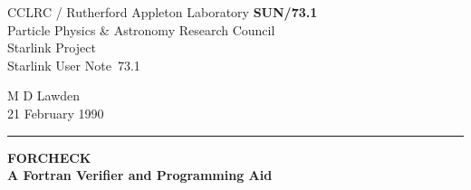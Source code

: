 \documentclass[11pt,twoside]{article}
\newcommand{\stardoccategory}  {Starlink User Note}
\newcommand{\stardocinitials}  {SUN}
\newcommand{\stardocnumber}    {73.1}
\newcommand{\stardocauthors}   {M D Lawden}
\newcommand{\stardocdate}      {21 February 1990}
\newcommand{\stardoctitle}     {FORCHECK\\[2ex]
                               A Fortran Verifier and Programming Aid}
\newcommand{\stardocname}{\stardocinitials /\stardocnumber}
\newenvironment{latexonly}{}{}
\begin{document}
\thispagestyle{empty}

\begin{latexonly}
   CCLRC / {\sc Rutherford Appleton Laboratory} \hfill {\bf \stardocname}\\
   {\large Particle Physics \& Astronomy Research Council}\\
   {\large Starlink Project\\}
   {\large \stardoccategory\ \stardocnumber}
   \begin{flushright}
   \stardocauthors\\
   \stardocdate
   \end{flushright}
   \vspace{-4mm}
   \rule{\textwidth}{0.5mm}
   \vspace{5mm}
   \begin{center}
   {\Huge\bf  \stardoctitle}
   \end{center}
   \vspace{5mm}
\end{latexonly}
\end{document}
